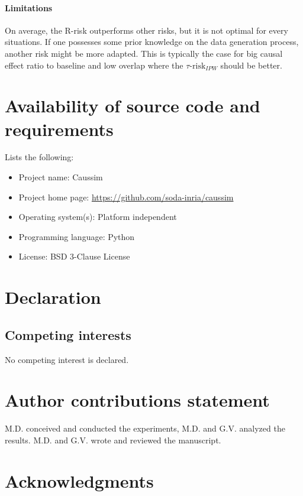 \documentclass[a4paper,num-refs]{oup-contemporary}%
\begin{document}
\paragraph{Limitations}

On average, the R-risk outperforms other risks, but it is not optimal for every
situations. If one possesses some prior knowledge on the data generation process,
another risk might be more adapted. This is typically the case for big causal
effect ratio to baseline and low overlap where the $\tau\text{-risk}_{IPW}$
should be better.



\section{Availability of source code and requirements}

Lists the following:
\begin{itemize}
    \item Project name: Caussim
    \item Project home page: \url{https://github.com/soda-inria/caussim}
    \item Operating system(s): Platform independent
    \item Programming language: Python
    \item License: BSD 3-Clause License
\end{itemize}


\section{Declaration}
\subsection{Competing interests}
No competing interest is declared.

\section{Author contributions statement}

M.D. conceived and conducted the experiments, M.D. and G.V. analyzed the results. M.D. and G.V. wrote and reviewed the manuscript.

\section{Acknowledgments}
\end{document}
